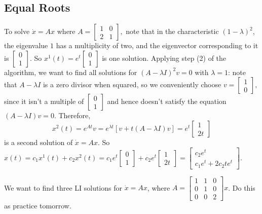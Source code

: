 \subsection{Equal Roots}
To solve $\dot x=Ax$ where $A=
\begin{bmatrix}
    1 & 0 \\ 2 & 1
\end{bmatrix},$ note that in the characteristic $(1-\lambda )^2$, the eigenvalue $1$ has a multiplicity of two, and the eigenvector corresponding to it is $
\begin{bmatrix}
   0\\1 
\end{bmatrix}$. So $x^1(t)=e^{t}
\begin{bmatrix}
    0\\1
\end{bmatrix}$ is one solution. Applying step (2) of the algorithm, we want to find all solutions for $(A-\lambda I)^2v=0$ with $\lambda=1$: note that $A-\lambda I$ is a zero divisor when squared, so we conveniently choose $v=
\begin{bmatrix}
    1\\0
\end{bmatrix},$ since it isn't a multiple of $
\begin{bmatrix}
    0\\1
\end{bmatrix}$ and hence doesn't satisfy the equation $(A-\lambda I)v=0$. Therefore, \[
x^2(t)=e^{At}v=e^{\lambda t}\left[ v+t(A-\lambda I)v \right] =e^{t}
\begin{bmatrix}
    1\\2t
\end{bmatrix}
\] is a second solution of $\dot x=Ax$. So $x(t)=c_1x^1(t)+c_2x^2(t)=
c_1e^{t}
\begin{bmatrix}
0\\1
\end{bmatrix}+c_2e^{t}
\begin{bmatrix}
    1\\2t
\end{bmatrix}=
\begin{bmatrix}
   c_2e^{t}\\c_1e^{t}+2c_2te^{t} 
\end{bmatrix}.$ 
\begin{example}
    We want to find three LI solutions for $\dot x=Ax$, where $A=
    \begin{bmatrix}
        1 & 1 & 0\\ 0 & 1 & 0\\ 0 & 0 & 2
    \end{bmatrix}x$. Do this as practice tomorrow.
\end{example}

